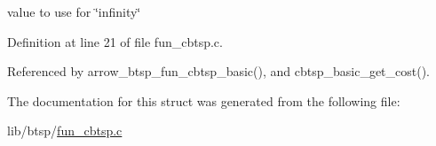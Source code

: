 value to use for \char`\"{}infinity\char`\"{} 

Definition at line 21 of file fun\_\-cbtsp.c.

Referenced by arrow\_\-btsp\_\-fun\_\-cbtsp\_\-basic(), and cbtsp\_\-basic\_\-get\_\-cost().

The documentation for this struct was generated from the following file:\begin{CompactItemize}
\item 
lib/btsp/\hyperlink{fun__cbtsp_8c}{fun\_\-cbtsp.c}\end{CompactItemize}
